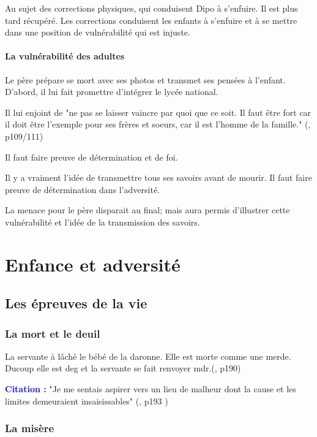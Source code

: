 \documentclass[a4paper, 11pt, hidelinks]{article}
\newcommand{\bs}{\bigskip}
\newcommand{\cit}{\large \textcolor{blue}{\textbf{Citation :}} \large }
\newcommand{\rb}[1]{\Romanbar{#1}}
\begin{document}
\bs

Au sujet des corrections physiques, qui conduisent Dipo à s'enfuire. Il est plus tard récupéré.
Les corrections conduisent les enfants à s'enfuire et à se mettre dans une position de vulnérabilité qui est injuste.




\paragraph{La vulnérabilité des adultes}

Le père prépare se mort avec ses photos et transmet ses pensées à l'enfant.
D'abord, il lui fait promettre d'intégrer le lycée national. 

Il lui enjoint de "ne pas se laisser vaincre par quoi que ce soit. 
Il faut être fort car il doit être l'exemple pour ses frères et soeurs, car il est l'homme de la famille." (\rb{11}, p109/111)


Il faut faire preuve de détermination et de foi.

Il y a vraiment l'idée de transmettre tous ses savoirs avant de mourir. Il faut faire preuve de détermination dans l'adversité.

\bs

La menace pour le père disparait au final; mais aura permis d'illustrer cette vulnérabilité et l'idée de la transmission des savoirs.


\section{Enfance et adversité}

\subsection{Les épreuves de la vie}

\subsubsection{La mort et le deuil}

La servante à lâché le bébé de la daronne. Elle est morte comme une merde. Ducoup elle est deg et la servante
se fait renvoyer mdr.(\rb{7}, p190)




\cit "Je me sentais aspirer vers un lieu de malheur dont la cause et les limites demeuraient insaisissables" (\rb{7}, p193 )


\subsubsection{La misère}
\end{document}
